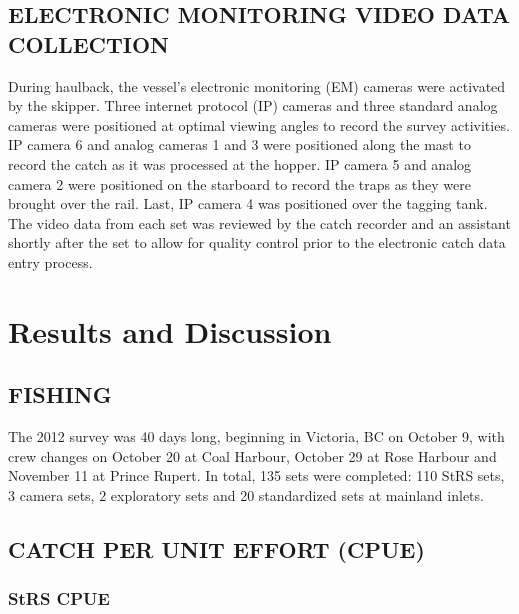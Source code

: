 \documentclass[12pt]{article}\usepackage[]{graphicx}\usepackage[]{color}
\begin{document}
\hypertarget{electronic-monitoring-video-data-collection}{%
\subsection{ELECTRONIC MONITORING VIDEO DATA COLLECTION}\label{electronic-monitoring-video-data-collection}}

During haulback, the vessel's electronic monitoring (EM) cameras were activated by the skipper. Three internet protocol (IP) cameras and three standard analog cameras were positioned at optimal viewing angles to record the survey activities. IP camera 6 and analog cameras 1 and 3 were positioned along the mast to record the catch as it was processed at the hopper. IP camera 5 and analog camera 2 were positioned on the starboard to record the traps as they were brought over the rail. Last, IP camera 4 was positioned over the tagging tank. The video data from each set was reviewed by the catch recorder and an assistant shortly after the set to allow for quality control prior to the electronic catch data entry process.

\hypertarget{results-and-discussion}{%
\section{Results and Discussion}\label{results-and-discussion}}

\hypertarget{fishing}{%
\subsection{FISHING}\label{fishing}}

The 2012 survey was 40 days long, beginning in Victoria, BC on October 9, with crew changes on October 20 at Coal Harbour, October 29 at Rose Harbour and November 11 at Prince Rupert. In total, 135 sets were completed: 110 StRS sets, 3 camera sets, 2 exploratory sets and 20 standardized sets at mainland inlets.

\hypertarget{catch-per-unit-effort-cpue}{%
\subsection{CATCH PER UNIT EFFORT (CPUE)}\label{catch-per-unit-effort-cpue}}

\hypertarget{strs-cpue}{%
\subsubsection{StRS CPUE}\label{strs-cpue}}
\end{document}
